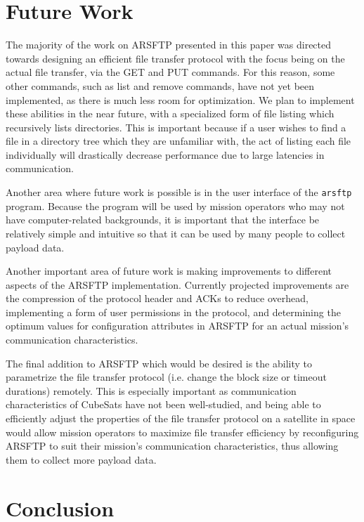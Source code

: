 \documentclass[journal]{./IEEEtran}
\begin{document}
\section{Future Work}

The majority of the work on ARSFTP presented in this paper was directed towards designing an efficient file transfer protocol with the focus being on the actual file transfer, via the GET and PUT commands.  For this reason, some other commands, such as list and remove commands, have not yet been implemented, as there is much less room for optimization.  We plan to implement these abilities in the near future, with a specialized form of file listing which recursively lists directories.  This is important because if a user wishes to find a file in a directory tree which they are unfamiliar with, the act of listing each file individually will drastically decrease performance due to large latencies in communication.

Another area where future work is possible is in the user interface of the {\tt arsftp} program.  Because the program will be used by mission operators who may not have computer-related backgrounds, it is important that the interface be relatively simple and intuitive so that it can be used by many people to collect payload data.

Another important area of future work is making improvements to different aspects of the ARSFTP implementation. Currently projected improvements are the compression of the protocol header and ACKs to reduce overhead, implementing a form of user permissions in the protocol, and determining the optimum values for configuration attributes in ARSFTP for an actual mission’s communication characteristics.

The final addition to ARSFTP which would be desired is the ability to parametrize the file transfer protocol (i.e. change the block size or timeout durations) remotely.  This is especially important as communication characteristics of CubeSats have not been well-studied, and being able to efficiently adjust the properties of the file transfer protocol on a satellite in space would allow mission operators to maximize file transfer efficiency by reconfiguring ARSFTP to suit their mission’s communication characteristics, thus allowing them to collect more payload data.

\section{Conclusion}
\end{document}
